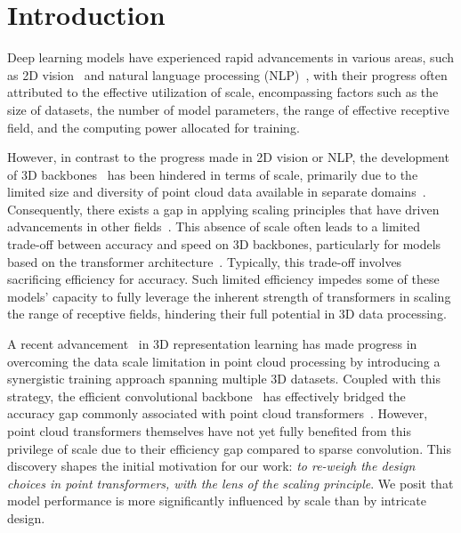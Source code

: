\section{Introduction}
\label{sec:intro}

Deep learning models have experienced rapid advancements in various areas, such as 2D vision~\cite{tian2021divide,goyal2021self,wang2022painter,kirillov2023segany} and natural language processing (NLP)~\cite{kaplan2020scaling,aribandi2022ext,touvron2023llama,openai2023gpt4}, with their progress often attributed to the effective utilization of scale, encompassing factors such as the size of datasets, the number of model parameters, the range of effective receptive field, and the computing power allocated for training.

However, in contrast to the progress made in 2D vision or NLP, the development of 3D backbones~\cite{qi2017pointnet, dai20183dmv, li2018pointcnn, wu2019pointconv} has been hindered in terms of scale, primarily due to the limited size and diversity of point cloud data available in separate domains~\cite{wu2023ppt}. Consequently, there exists a gap in applying scaling principles that have driven advancements in other fields~\cite{kaplan2020scaling}. This absence of scale often leads to a limited trade-off between accuracy and speed on 3D backbones, particularly for models based on the transformer architecture~\cite{zhao2021point, guo2021pct}. Typically, this trade-off involves sacrificing efficiency for accuracy. Such limited efficiency impedes some of these models' capacity to fully leverage the inherent strength of transformers in scaling the range of receptive fields, hindering their full potential in 3D data processing. 

A recent advancement~\cite{wu2023ppt} in 3D representation learning has made progress in overcoming the data scale limitation in point cloud processing by introducing a synergistic training approach spanning multiple 3D datasets. Coupled with this strategy, the efficient convolutional backbone~\cite{choy20194d} has effectively bridged the accuracy gap commonly associated with point cloud transformers~\cite{wu2022point, lai2022stratified}. However, point cloud transformers themselves have not yet fully benefited from this privilege of scale due to their efficiency gap compared to sparse convolution. This discovery shapes the initial motivation for our work:  \textit{to re-weigh the design choices in point transformers, with the lens of the scaling principle}. We posit that model performance is more significantly influenced by scale than by intricate design.

